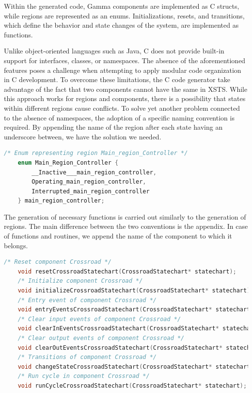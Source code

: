 Within the generated code, Gamma components are implemented as C structs, while regions are represented as an enums. Initializations, resets, and transitions, which define the behavior and state changes of the system, are implemented as functions.

Unlike object-oriented languages such as Java, C does not provide built-in support for interfaces, classes, or namespaces. The absence of the aforementioned features poses a challenge when attempting to apply modular code organization in C development. To overcome these limitations, the C code generator take advantage of the fact that two components cannot have the same in XSTS. While this approach works for regions and components, there is a possibility that states within different regions cause conflicts. To solve yet another problem connected to the absence of namespaces, the adoption of a specific naming convention is required. By appending the name of the region after each state having an underscore between, we have the solution we needed.
\bigskip

\begin{lstlisting}[language=C, caption={Representation of the Main Region in C}]
	/* Enum representing region Main_region_Controller */
	enum Main_Region_Controller {
		__Inactive___main_region_controller,
		Operating_main_region_controller,
		Interrupted_main_region_controller
	} main_region_controller;
\end{lstlisting}

The generation of necessary functions is carried out similarly to the generation of regions. The main difference between the two conventions is the appendix. In case of functions and routines, we append the name of the component to which it belongs.
\bigskip

\begin{lstlisting}[language=C, caption={Function declarations in C}]
	/* Reset component Crossroad */
	void resetCrossroadStatechart(CrossroadStatechart* statechart);
	/* Initialize component Crossroad */
	void initializeCrossroadStatechart(CrossroadStatechart* statechart);
	/* Entry event of component Crossroad */
	void entryEventsCrossroadStatechart(CrossroadStatechart* statechart);
	/* Clear input events of component Crossroad */
	void clearInEventsCrossroadStatechart(CrossroadStatechart* statechart);
	/* Clear output events of component Crossroad */
	void clearOutEventsCrossroadStatechart(CrossroadStatechart* statechart);
	/* Transitions of component Crossroad */
	void changeStateCrossroadStatechart(CrossroadStatechart* statechart);
	/* Run cycle in component Crossroad */
	void runCycleCrossroadStatechart(CrossroadStatechart* statechart);
\end{lstlisting}

